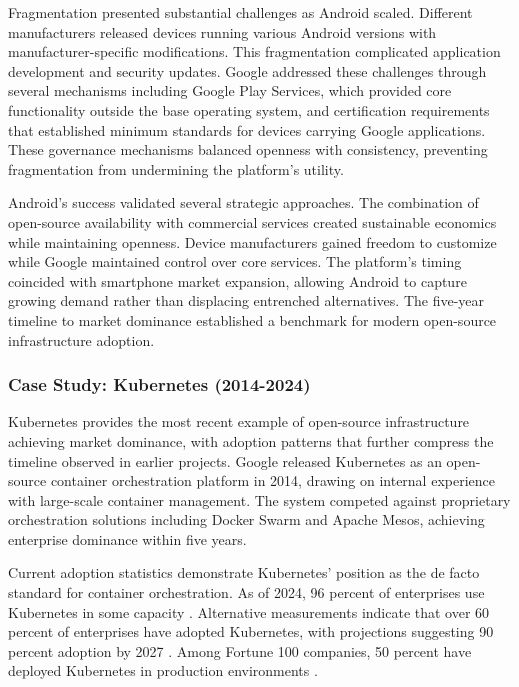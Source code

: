 Fragmentation presented substantial challenges as Android scaled. Different manufacturers released devices running various Android versions with manufacturer-specific modifications. This fragmentation complicated application development and security updates. Google addressed these challenges through several mechanisms including Google Play Services, which provided core functionality outside the base operating system, and certification requirements that established minimum standards for devices carrying Google applications. These governance mechanisms balanced openness with consistency, preventing fragmentation from undermining the platform's utility.

Android's success validated several strategic approaches. The combination of open-source availability with commercial services created sustainable economics while maintaining openness. Device manufacturers gained freedom to customize while Google maintained control over core services. The platform's timing coincided with smartphone market expansion, allowing Android to capture growing demand rather than displacing entrenched alternatives. The five-year timeline to market dominance established a benchmark for modern open-source infrastructure adoption.

\subsubsection{Case Study: Kubernetes (2014-2024)}

Kubernetes provides the most recent example of open-source infrastructure achieving market dominance, with adoption patterns that further compress the timeline observed in earlier projects. Google released Kubernetes as an open-source container orchestration platform in 2014, drawing on internal experience with large-scale container management. The system competed against proprietary orchestration solutions including Docker Swarm and Apache Mesos, achieving enterprise dominance within five years.

Current adoption statistics demonstrate Kubernetes' position as the de facto standard for container orchestration. As of 2024, 96 percent of enterprises use Kubernetes in some capacity \cite{kubernetes_edgedelta2024}. Alternative measurements indicate that over 60 percent of enterprises have adopted Kubernetes, with projections suggesting 90 percent adoption by 2027 \cite{kubernetes_datahub2024}. Among Fortune 100 companies, 50 percent have deployed Kubernetes in production environments \cite{kubernetes_unyaml2024}.

